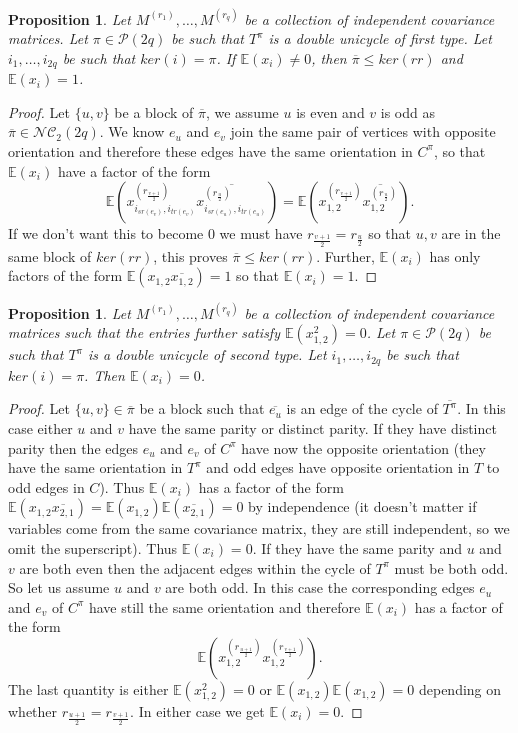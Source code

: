 \documentclass{article}
\newtheorem{proposition}[theorem]{Proposition}
\theoremstyle{definition}
\newcommand{\E}{\mathbb{E}}
\newcommand{\cP}{\mathcal{P}}
\newcommand{\NC}{\mathcal{NC}}
\begin{document}
{\begin{proposition}\label{Proposition: contribution of double unicycle of first type}
Let $M^{(r_1)},\dots, M^{(r_q)}$ be a collection of independent covariance matrices. Let $\pi\in \cP(2q)$ be such that $T^\pi$ is a double unicycle of first type. Let $i_1,\dots,i_{2q}$ be such that $ker(i)=\pi$. If $\E(x_i)\neq 0$, then $\overline{\pi}\leq ker(rr)$ and $\E(x_i)=1$.
\end{proposition}
\begin{proof}
Let $\{u,v\}$ be a block of $\overline{\pi}$, we assume $u$ is even and $v$ is odd as $\overline{\pi}\in \NC_2(2q)$. We know $e_u$ and $e_v$ join the same pair of vertices with opposite orientation and therefore these edges have the same orientation in $C^\pi$, so that $\E(x_i)$ have a factor of the form
$$\E(x_{i_{sr(e_v)},i_{tr(e_v)}}^{(r_{\frac{v+1}{2}})}\overline{x_{i_{sr(e_u)},i_{tr(e_u)}}^{(r_{\frac{u}{2}})}})=\E(x_{1,2}^{(r_{\frac{v+1}{2}})}\overline{x_{1,2}^{(r_{\frac{u}{2}})}}).$$
If we don't want this to become $0$ we must have $r_{\frac{v+1}{2}}=r_{\frac{u}{2}}$ so that $u,v$ are in the same block of $ker(rr)$, this proves $\overline{\pi}\leq ker(rr)$. Further, $\E(x_i)$ has only factors of the form $\E(x_{1,2}\overline{x_{1,2}})=1$ so that $\E(x_i)=1$. 
\end{proof}

\begin{proposition}\label{Proposition: contribution of double unicycle of second type}
Let $M^{(r_1)},\dots, M^{(r_q)}$ be a collection of independent covariance matrices such that the entries further satisfy $\E(x_{1,2}^2)=0$. Let $\pi\in \cP(2q)$ be such that $T^\pi$ is a double unicycle of second type. Let $i_1,\dots,i_{2q}$ be such that $ker(i)=\pi$. Then $\E(x_i)= 0$.
\end{proposition}
\begin{proof}
Let $\{u,v\}\in\overline{\pi}$ be a block such that $\overline{e_u}$ is an edge of the cycle of $\overline{T^\pi}$. In this case either $u$ and $v$ have the same parity or distinct parity. If they have distinct parity then the edges $e_u$ and $e_v$ of $C^\pi$ have now the opposite orientation (they have the same orientation in $T^\pi$ and odd edges have opposite orientation in $T$ to odd edges in $C$). Thus $\E(x_i)$ has a factor of the form $\E(x_{1,2}\overline{x_{2,1}})=\E(x_{1,2})\E(\overline{x_{2,1}})=0$ by independence (it doesn't matter if variables come from the same covariance matrix, they are still independent, so we omit the superscript). Thus $\E(x_i)=0$. If they have the same parity and $u$ and $v$ are both even then the adjacent edges within the cycle of $T^\pi$ must be both odd. So let us assume $u$ and $v$ are both odd. In this case the corresponding edges $e_u$ and $e_v$ of $C^\pi$ have still the same orientation and therefore $\E(x_i)$ has a factor of the form
$$\E(x_{1,2}^{(r_{\frac{u+1}{2}})}x_{1,2}^{(r_{\frac{v+1}{2}})}).$$
The last quantity is either $\E(x_{1,2}^2)=0$ or $\E(x_{1,2})\E(x_{1,2})=0$ depending on whether $r_{\frac{u+1}{2}}=r_{\frac{v+1}{2}}$. In either case we get $\E(x_i)=0$.
\end{proof}

}
\end{document}
